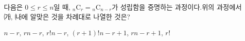 다음은 $0\le r\le n$일 때, ${}_n\mathrm{C}_r={}_n\mathrm{C}_{n-r}$가 성립함을 증명하는 과정이다.\noindent 위의 과정에서 ㈎, ㈏에 알맞은 것을 차례대로 나열한 것은?
\begin{choicesii}{$n-r$, $r$}{$n-r$, $r!$}{$n-r$, $(r+1)!$}{$n-r+1$, $r$}{$n-r+1$, $r!$}\end{choicesii}
